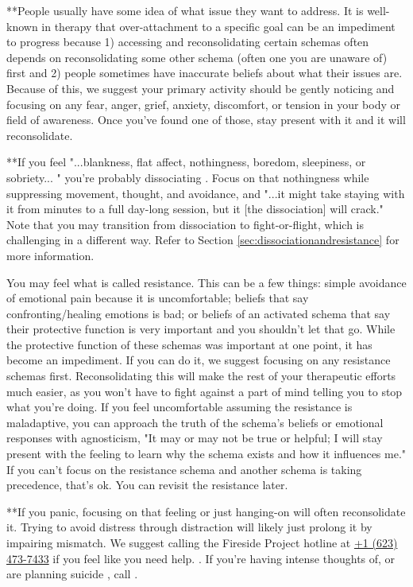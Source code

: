 \documentclass[12pt,letterpaper]{book}
\begin{document}
**People usually have some idea of what issue they want to address. It is well-known in therapy that over-attachment to a specific goal can be an impediment to progress because 1) accessing and reconsolidating certain schemas often depends on reconsolidating some other schema (often one you are unaware of) first and 2) people sometimes have inaccurate beliefs about what their issues are. Because of this, we suggest your primary activity should be gently noticing and focusing on any fear, anger, grief, anxiety, discomfort, or tension in your body or field of awareness. Once you've found one of those, stay present with it and it will reconsolidate.

**If you feel "...blankness, flat affect, nothingness, boredom, sleepiness, or sobriety... " you're probably dissociating \cite{razviPSIP}. Focus on that nothingness while suppressing movement, thought, and avoidance, and "...it might take staying with it from minutes to a full day-long session, but it [the dissociation] will crack." Note that you may transition from dissociation to fight-or-flight, which is challenging in a different way. Refer to Section \ref{sec:dissociationandresistance} for more information.

You may feel what is called resistance. This can be a few things: simple avoidance of emotional pain because it is uncomfortable; beliefs that say confronting/healing emotions is bad; or beliefs of an activated schema that say their protective function is very important and you shouldn't let that go. While the protective function of these schemas was important at one point, it has become an impediment. If you can do it, we suggest focusing on any resistance schemas first. Reconsolidating this will make the rest of your therapeutic efforts much easier, as you won't have to fight against a part of mind telling you to stop what you're doing. If you feel uncomfortable assuming the resistance is maladaptive, you can approach the truth of the schema's beliefs or emotional responses with agnosticism, "It may or may not be true or helpful; I will stay present with the feeling to learn why the schema exists and how it influences me." If you can't focus on the resistance schema and another schema is taking precedence, that's ok. You can revisit the resistance later.

**If you panic, focusing on that feeling or just hanging-on will often reconsolidate it. Trying to avoid distress through distraction will likely just prolong it by impairing mismatch. We suggest calling the Fireside Project hotline at \href{tel:1-623-473-7433}{+1 (623) 473-7433} if you feel like you need help. \cite{firesideProject}. If you're having intense thoughts of, or are planning suicide , call .
\end{document}
